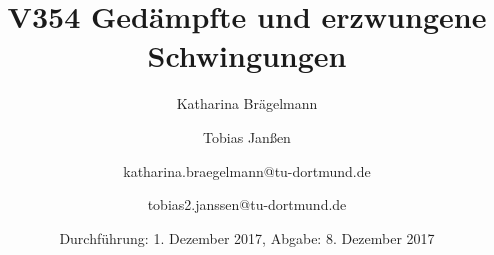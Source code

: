 
\title{V354 Gedämpfte und erzwungene Schwingungen}
\author{Katharina Brägelmann \and Tobias Janßen \and katharina.braegelmann@tu-dortmund.de \and tobias2.janssen@tu-dortmund.de}
\date{Durchführung: 1. Dezember 2017, Abgabe: 8. Dezember 2017}
\maketitle

\tableofcontents
